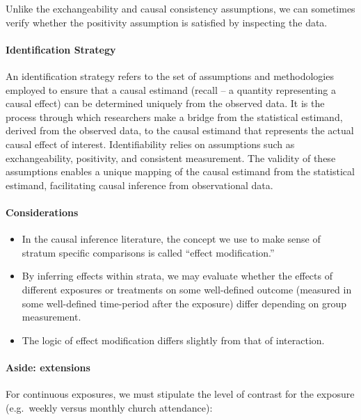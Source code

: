 \documentclass[
  singlecolumn]{article}
\let\oldparagraph\paragraph
\renewcommand{\paragraph}[1]{\oldparagraph{#1}\mbox{}}
\providecommand{\tightlist}{%
  \setlength{\itemsep}{0pt}\setlength{\parskip}{0pt}}\usepackage{longtable,booktabs,array}
\begin{document}
Unlike the exchangeability and causal consistency assumptions, we can
sometimes verify whether the positivity assumption is satisfied by
inspecting the data.

\paragraph{\texorpdfstring{\textbf{Identification
Strategy}}{Identification Strategy}}\label{identification-strategy}

An identification strategy refers to the set of assumptions and
methodologies employed to ensure that a causal estimand (recall -- a
quantity representing a causal effect) can be determined uniquely from
the observed data. It is the process through which researchers make a
bridge from the statistical estimand, derived from the observed data, to
the causal estimand that represents the actual causal effect of
interest. Identifiability relies on assumptions such as exchangeability,
positivity, and consistent measurement. The validity of these
assumptions enables a unique mapping of the causal estimand from the
statistical estimand, facilitating causal inference from observational
data.

\paragraph{Considerations}\label{considerations}

\begin{itemize}
\tightlist
\item
  In the causal inference literature, the concept we use to make sense
  of stratum specific comparisons is called ``effect modification.''
\item
  By inferring effects within strata, we may evaluate whether the
  effects of different exposures or treatments on some well-defined
  outcome (measured in some well-defined time-period after the exposure)
  differ depending on group measurement.
\item
  The logic of effect modification differs slightly from that of
  interaction.
\end{itemize}

\paragraph{Aside: extensions}\label{aside-extensions}

For continuous exposures, we must stipulate the level of contrast for
the exposure (e.g.~weekly versus monthly church attendance):
\end{document}
